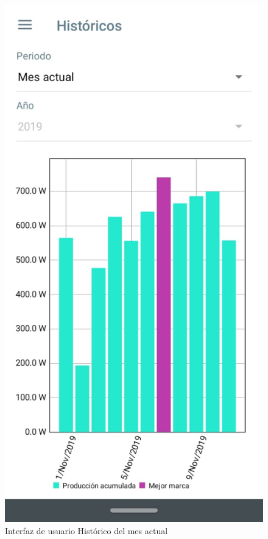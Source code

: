 \begin{figure}[H]
	\centering
	\includegraphics[scale=0.4]{Capitulo4/software/submodulos/images/man27.png}
	\caption{Interfaz de usuario Histórico del mes actual}
	\label{fig:Historico mes actual}
\end{figure}

